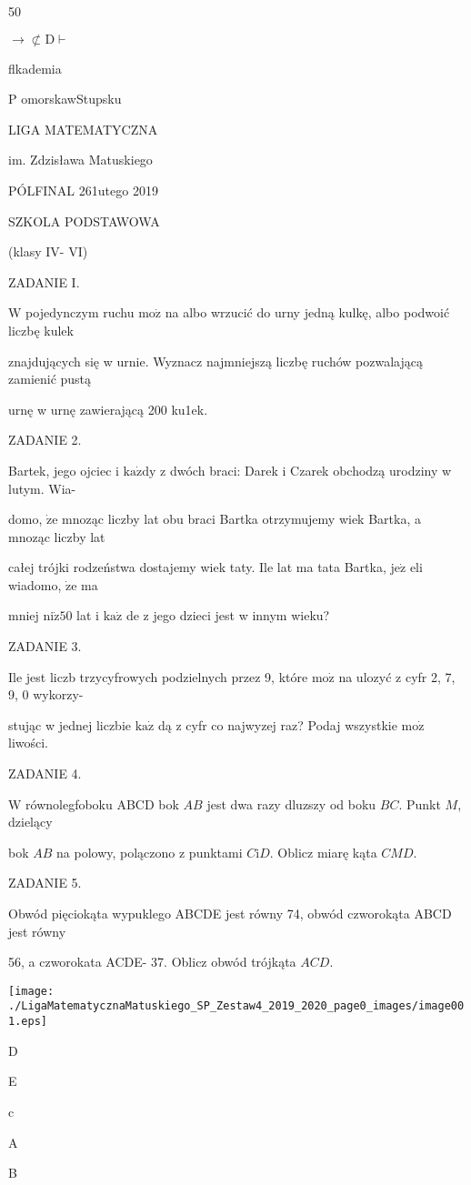 \documentclass[a4paper,12pt]{article}
\begin{document}
50

$\rightarrow\not\subset \mathrm{D}\vdash$

flkademia

P omorskawStupsku

LIGA MATEMATYCZNA

im. Zdzisława Matuskiego

PÓLFINAL 261utego 2019

SZKOLA PODSTAWOWA

(klasy IV- VI)

ZADANIE I.

$\mathrm{W}$ pojedynczym ruchu $\mathrm{m}\mathrm{o}\dot{\mathrm{z}}$ na albo wrzucić do urny jedną kulkę, albo podwoić liczbę kulek

znajdujących się w urnie. Wyznacz najmniejszą liczbę ruchów pozwalającą zamienić pustą

urnę w urnę zawierającą 200 ku1ek.

ZADANIE 2.

Bartek, jego ojciec i $\mathrm{k}\mathrm{a}\dot{\mathrm{z}}\mathrm{d}\mathrm{y}$ z dwóch braci: Darek i Czarek obchodzą urodziny w lutym. Wia-

domo, $\dot{\mathrm{z}}\mathrm{e}$ mnoząc liczby lat obu braci Bartka otrzymujemy wiek Bartka, a mnoząc liczby lat

całej trójki rodzeństwa dostajemy wiek taty. Ile lat ma tata Bartka, $\mathrm{j}\mathrm{e}\dot{\mathrm{z}}$ eli wiadomo, $\dot{\mathrm{z}}\mathrm{e}$ ma

mniej $\mathrm{n}\mathrm{i}\dot{\mathrm{z}}50$ lat i $\mathrm{k}\mathrm{a}\dot{\mathrm{z}}$ de z jego dzieci jest w innym wieku?

ZADANIE 3.

Ile jest liczb trzycyfrowych podzielnych przez 9, które $\mathrm{m}\mathrm{o}\dot{\mathrm{z}}$ na ulozyć z cyfr 2, 7, 9, 0 wykorzy-

stując w jednej liczbie $\mathrm{k}\mathrm{a}\dot{\mathrm{z}}$ dą z cyfr co najwyzej raz? Podaj wszystkie $\mathrm{m}\mathrm{o}\dot{\mathrm{z}}$ liwości.

ZADANIE 4.

$\mathrm{W}$ równolegfoboku ABCD bok $AB$ jest dwa razy dluzszy od boku $BC$. Punkt $M$, dzielący

bok $AB$ na polowy, polączono z punktami $C\mathrm{i}D$. Oblicz miarę kąta $CMD.$

ZADANIE 5.

Obwód pięciokąta wypuklego ABCDE jest równy 74, obwód czworokąta ABCD jest równy

56, a czworokata ACDE- 37. Oblicz obwód trójkąta $ACD.$
\begin{center}
\texttt{[image: ./LigaMatematycznaMatuskiego\_SP\_Zestaw4\_2019\_2020\_page0\_images/image001.eps]}
\end{center}
D

E

c

A

B
\end{document}
